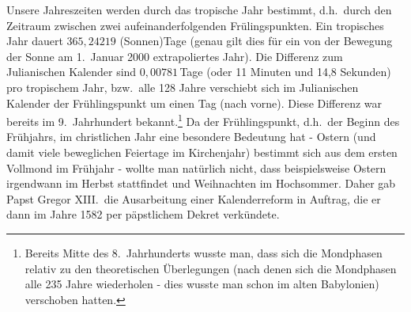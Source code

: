 Unsere Jahreszeiten werden durch das tropische Jahr bestimmt, d.h.\ durch den
Zeitraum zwischen zwei aufeinanderfolgenden Fr\"ulingspunkten.
Ein tropisches Jahr dauert $365,24219$ (Sonnen)\-Tage (genau gilt dies f\"ur ein von der Bewegung
der Sonne am 1.\ Januar 2000 extrapoliertes Jahr). Die Differenz zum Julianischen Kalender
sind $0,00781$\,Tage (oder 11 Minuten und 14,8 Sekunden) pro tropischem Jahr, bzw.\ alle 128 Jahre verschiebt sich
im Julianischen Kalender der Fr\"uhlingspunkt um einen Tag (nach vorne). Diese Differenz war
bereits im 9.\ Jahrhundert bekannt.\footnote{Bereits Mitte des 8.\ Jahrhunderts wusste man, dass
sich die Mondphasen relativ zu den theoretischen \"Uberlegungen (nach denen sich die
Mondphasen alle 235 Jahre wiederholen - dies wusste man schon im alten Babylonien) 
verschoben hatten.} 
Da der Fr\"uhlingspunkt, d.h.\ der Beginn des Fr\"uhjahrs, 
im christlichen Jahr eine besondere Bedeutung hat - Ostern (und damit viele beweglichen Feiertage
im Kirchenjahr) bestimmt sich aus dem ersten
Vollmond im Fr\"uhjahr - wollte man nat\"urlich nicht, dass beispielsweise Ostern irgendwann
im Herbst stattfindet und Weihnachten im Hochsommer. Daher gab Papst Gregor XIII.\ die Ausarbeitung einer 
Kalenderreform in Auftrag, die er dann im Jahre 1582 per p\"apstlichem Dekret verk\"undete.

